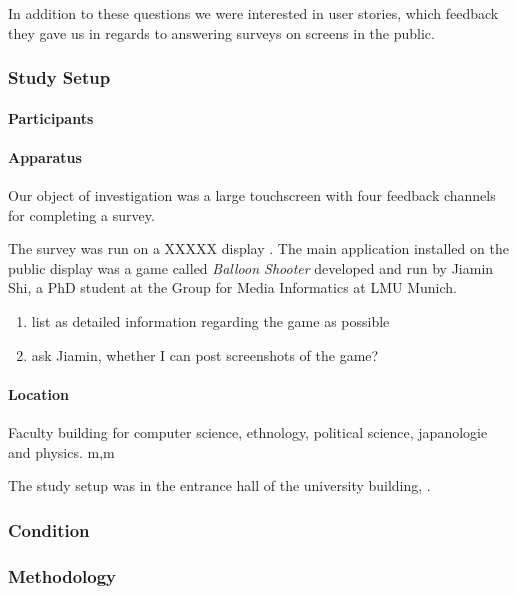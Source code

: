 	In addition to these questions we were interested in user stories, which feedback they gave us in regards to answering surveys on screens in the public.

\subsubsection{Study Setup}

	\paragraph{Participants}

	\paragraph{Apparatus}

		Our object of investigation was a large touchscreen with four feedback channels for completing a survey.

		The survey was run on a XXXXX display . The main application installed on the public display was a game called \textit{Balloon Shooter} developed and run by Jiamin Shi, a PhD student at the Group for Media Informatics at LMU Munich.

		\begin{enumerate}
		\item list as detailed information regarding the game as possible
		\item ask Jiamin, whether I can post screenshots of the game?
		\end{enumerate}

	\paragraph{Location}

	Faculty building for computer science, ethnology, political science, japanologie and physics. m,m

	The study setup was in the entrance hall of the university building, .



\subsubsection{Condition}


\subsubsection{Methodology}

